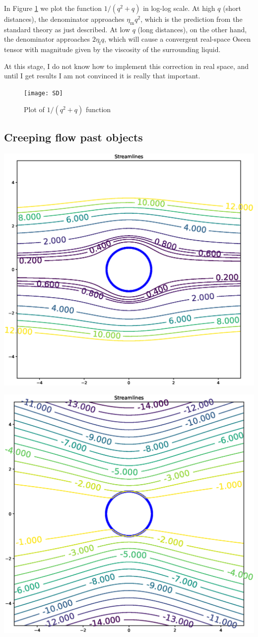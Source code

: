 In Figure \ref{fig:SD} we plot the function $1/(q^2+q)$ in log-log
scale.  At high $q$ (short distances), the denominator approaches
\( \eta_\mathrm{m} q^2 \),
which is the prediction from the standard theory as just described. At
low $q$ (long distances), on the other hand, the denominator
approaches \( 2 \eta_\mathrm{f} q \),
which will cause a convergent real-space Oseen tensor with magnitude
given by the viscosity of the surrounding liquid.

At this stage, I do not know how to implement this correction in real
space, and until I get results I am not convinced it is really that
important.

\begin{figure}
  \centering
  \begin{minipage}{0.45\textwidth}
      \texttt{[image: SD]}
  \end{minipage}
  \caption{Plot of $1/(q^2+q)$ function
    \label{fig:SD}}
\end{figure}



\subsection{Creeping flow past objects}



\includegraphics[width=0.8\linewidth]{figures/creeping_flow_past_sphere}

\includegraphics[width=0.8\linewidth]{figures/creeping_flow_past_sphere_moving}
